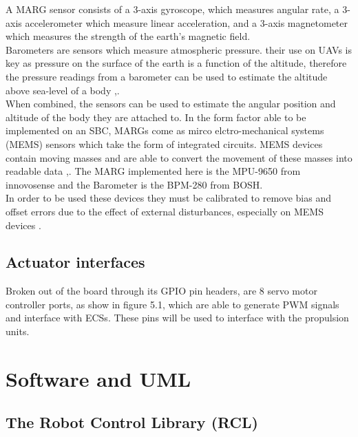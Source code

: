 \documentclass[12pt,a4paper,twoside]{report}
\begin{document}
				A MARG sensor consists of a 3-axis gyroscope, which measures angular rate, a 3-axis accelerometer which measure linear acceleration, and a 3-axis magnetometer which measures the strength of the earth's magnetic field. 
				\\
				Barometers are sensors which measure atmospheric pressure. their use on UAVs is key as pressure on the surface of the earth is a function of the altitude, therefore the pressure readings from a barometer can be used to estimate the altitude above sea-level of a body \cite{20},\cite{29}.
				\\
				When combined, the sensors can be used to estimate the angular position and altitude of the body they are attached to. In the form factor able to be implemented on an SBC, MARGs come as mirco elctro-mechanical systems (MEMS) sensors which take the form of integrated circuits. MEMS devices contain moving masses and are able to convert the movement of these masses into readable data \cite{20},\cite{29}. The MARG implemented here is the MPU-9650 from innovosense and the Barometer is the BPM-280 from BOSH.
				\\
				In order to be used these devices they must be calibrated to remove bias and offset errors due to the effect of external disturbances, especially on MEMS devices \cite{29}. 
				
			\subsection{Actuator interfaces}
			
				Broken out of the board through its GPIO pin headers, are 8 servo motor controller ports, as show in figure 5.1, which are able to generate PWM signals and interface with ECSs. These pins will be used to interface with the propulsion units.
				
		\section{Software and UML}
		
			\subsection{The Robot Control Library (RCL)}
			
\end{document}
